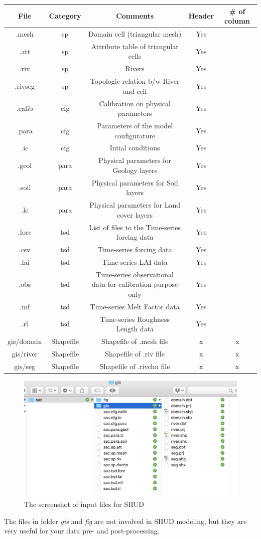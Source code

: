 \documentclass[]{scrbook}
\begin{document}
\begin{longtable}[]{@{}ccccc@{}}
\toprule
File & Category & Comments & Header & \# of column\tabularnewline
\midrule
\endhead
.mesh & sp & Domain cell (triangular mesh) & Yes &\tabularnewline
.att & sp & Attribute table of triangular cells & Yes &\tabularnewline
.riv & sp & Rivers & Yes &\tabularnewline
.rivseg & sp & Topologic relation b/w River and cell & Yes
&\tabularnewline
.calib & cfg & Calibration on physical parameters & Yes &\tabularnewline
.para & cfg & Parameters of the model configurature & Yes
&\tabularnewline
.ic & cfg & Intial conditions & Yes &\tabularnewline
.geol & para & Physical parameters for Geology layers & Yes
&\tabularnewline
.soil & para & Physical parameters for Soil layers & Yes
&\tabularnewline
.lc & para & Physical parameters for Land cover layers & Yes
&\tabularnewline
.forc & tsd & List of files to the Time-series forcing data & Yes
&\tabularnewline
.csv & tsd & Time-series forcing data & Yes &\tabularnewline
.lai & tsd & Time-series LAI data & Yes &\tabularnewline
.obs & tsd & Time-series observational data for calibration purpose only
& Yes &\tabularnewline
.mf & tsd & Time-series Melt Factor data & Yes &\tabularnewline
.rl & tsd & Time-series Roughness Length data & Yes &\tabularnewline
gis/domain & Shapefile & Shapefile of .mesh file & x & x\tabularnewline
gis/river & Shapefile & Shapefile of .riv file & x & x\tabularnewline
gis/seg & Shapefile & Shapefile of .rivchn file & x & x\tabularnewline
\bottomrule
\end{longtable}

\begin{figure}
\centering
\includegraphics{Fig/IO/Inputfiles.png}
\caption{The screenshot of input files for SHUD}
\end{figure}

The files in folder \emph{gis} and \emph{fig} are not involved in SHUD
modeling, but they are very useful for your data pre- and
post-processing.
\end{document}
